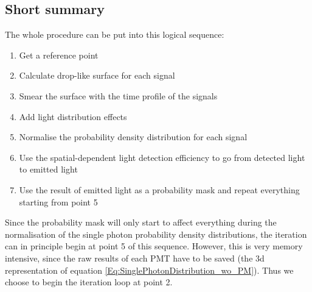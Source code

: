   
  
  
  \subsection*{Short summary}
  
  The whole procedure can be put into this logical sequence:
  
  \begin{enumerate}
   \item Get a reference point
   \item Calculate drop-like surface for each signal
   \item Smear the surface with the time profile of the signals
   \item Add light distribution effects
   \item Normalise the probability density distribution for each signal 
   \item Use the spatial-dependent light detection efficiency to go from detected light to emitted light
   \item Use the result of emitted light as a probability mask and repeat everything starting from point 5
  \end{enumerate}

  Since the probability mask will only start to affect everything during the normalisation of the single photon probability density distributions,
  the iteration can in principle begin at point 5 of this sequence. However, this is very memory intensive, since the raw results of each PMT have
  to be saved (the 3d representation of equation \ref{Eq:SinglePhotonDistribution_wo_PM}). Thus we choose to begin the iteration loop at point 2. 
  
  
 
 
  
